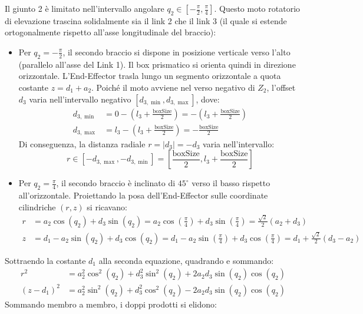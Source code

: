 \documentclass[11pt, a4paper]{report}
\begin{document}
Il giunto 2 è limitato nell'intervallo angolare $q_{2} \in \left[-\frac{\pi}{2}, \frac{\pi}{4}\right]$. Questo moto rotatorio di elevazione trascina solidalmente sia il link 2 che il link 3 (il quale si estende ortogonalmente rispetto all'asse longitudinale del braccio):
\begin{itemize}
  \item Per $q_{2} = -\frac{\pi}{2}$, il secondo braccio si dispone in posizione verticale verso l'alto (parallelo all'asse del Link 1). Il box prismatico si orienta quindi in direzione orizzontale. L'End-Effector trasla lungo un segmento orizzontale a quota costante $z = d_1 + a_2$. Poiché il moto avviene nel verso negativo di $Z_{2}$, l'offset $d_{3}$ varia nell'intervallo negativo $[d_{3,\min}, d_{3,\max}]$, dove:
  \begin{align*}
    d_{3,\min} &= 0 - \left(l_{3} + \frac{\text{boxSize}}{2}\right) = - \left(l_{3} + \frac{\text{boxSize}}{2}\right) \\
    d_{3,\max} &= l_3 - \left(l_{3} + \frac{\text{boxSize}}{2}\right) = - \frac{\text{boxSize}}{2}
  \end{align*}
  Di conseguenza, la distanza radiale $r = |d_3| = -d_{3}$ varia nell'intervallo:
  \[
    r \in \left[ -d_{3,\max}, -d_{3,\min} \right] = \left[ \frac{\text{boxSize}}{2}, l_3 + \frac{\text{boxSize}}{2} \right]
  \]
  \item Per $q_{2} = \frac{\pi}{4}$, il secondo braccio è inclinato di $45^\circ$ verso il basso rispetto all'orizzontale. Proiettando la posa dell'End-Effector sulle coordinate cilindriche $(r, z)$ si ricavano:
  \begin{align*}
    r &= a_{2}\cos(q_{2}) + d_{3} \sin(q_{2}) = a_{2}\cos\left(\frac{\pi}{4}\right) + d_{3} \sin\left(\frac{\pi}{4}\right) = \frac{\sqrt{2}}{2} (a_{2} + d_{3})\\
    z &= d_{1} - a_{2} \sin(q_{2}) + d_{3} \cos(q_{2}) = d_{1} - a_{2} \sin\left(\frac{\pi}{4}\right) + d_{3} \cos\left(\frac{\pi}{4}\right) = d_{1} + \frac{\sqrt{2}}{2} (d_{3} - a_{2})
  \end{align*}
\end{itemize}
Sottraendo la costante $d_1$ alla seconda equazione, quadrando e sommando:
\begin{align*}
  r^2 &= a_2^2 \cos^2(q_2) + d_3^2 \sin^2(q_2) + 2 a_2 d_3 \sin(q_2) \cos(q_2)\\
  (z - d_1)^2 &= a_2^2 \sin^2(q_2) + d_3^2 \cos^2(q_2) - 2 a_2 d_3 \sin(q_2) \cos(q_2)
\end{align*}
Sommando membro a membro, i doppi prodotti si elidono:
\end{document}
